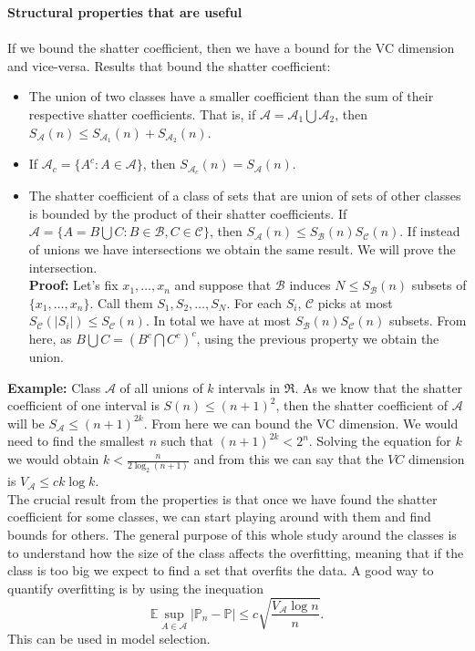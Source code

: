 \documentclass[11pt, english]{article}
\begin{document}
\textbf{Structural properties that are useful}\\\\ %
If we bound the shatter coefficient, then we have a bound for the VC dimension and vice-versa. Results that bound the shatter coefficient:
\begin{itemize}
	\item The union of two classes have a smaller coefficient than the sum of their respective shatter coefficients. That is, if $\mathcal{A}=\mathcal{A}_1\bigcup\mathcal{A}_2$, then 
	$S_{\mathcal{A}} (n)\leq S_{\mathcal{A}_1}(n) +S_{\mathcal{A}_2}(n)$.
 	\item If $\mathcal{A}_c=\{A^c:A\in\mathcal{A}\}$, then $S_{\mathcal{A}_c}(n)=S_{\mathcal{A}}(n)$.
	\item The shatter coefficient of a class of sets that are union of sets of other classes is bounded by the product of their shatter coefficients. If $\mathcal{A}=\{A=B\bigcup C:B\in\mathcal{B},C\in\mathcal{C}\}$, then $S_{\mathcal{A}}(n)\leq S_{\mathcal{B}}(n)S_{\mathcal{C}}(n)$. If instead of unions we have intersections we obtain the same result. We will prove the intersection.\\
	\textbf{Proof:} Let's fix $x_1,\dots,x_n$ and suppose that $\mathcal{B}$ induces $N\leq S_{\mathcal{B}}(n)$ subsets of $\{x_1,\dots,x_n\}$. Call them $S_1,S_2,\dots,S_N$. For each $S_i$, $\mathcal{C}$ picks at most $S_{\mathcal{C}}(|S_i|)\leq S_{\mathcal{C}}(n)$. In total we have at most $S_{\mathcal{B}}(n)S_{\mathcal{C}}(n)$ subsets. From here, as $B\bigcup C=(B^c\bigcap C^c)^c$, using the previous property we obtain the union.
\end{itemize}
\textbf{Example:} Class $\mathcal{A}$ of all unions of $k$ intervals in $\Re$. As we know that the shatter coefficient of one interval is $S(n)\leq (n+1)^2$, then the shatter coefficient of $\mathcal{A}$ will be $S_{\mathcal{A}}\leq (n+1)^{2k}$. From here we can bound the VC dimension. We would need to find the smallest $n$ such that $(n+1)^{2k}<2^n$. Solving the equation for $k$ we would obtain $k<\frac{n}{2\log_2(n+1)}$ and from this we can say that the $VC$ dimension is $V_{\mathcal{A}}\leq ck\log k$.\\

The crucial result from the properties is that once we have found the shatter coefficient for some classes, we can start playing around with them and find bounds for others. The general purpose of this whole study around the classes is to understand how the size of the class  affects the overfitting, meaning that if the class is too big we expect to find a set that overfits the data. A good way to quantify overfitting is by using the inequation 
\begin{equation}
	\mathbb{E}\underset{A\in\mathcal{A}}{\sup}|\mathbb{P}_n-\mathbb{P}|\leq c\sqrt{\frac{V_{\mathcal{A}}\log n}{n}}.
\end{equation}
This can be used in model selection.
\end{document}
